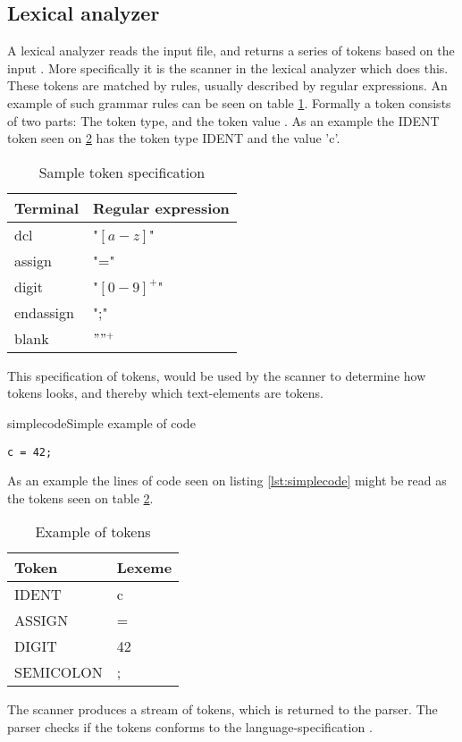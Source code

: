 \subsection{Lexical analyzer}
A lexical analyzer reads the input file, and returns a series of tokens based on the input \citep{CraftingACompiler}. More specifically it is the scanner in the lexical analyzer which does this. These tokens are matched by rules, usually described by regular expressions. An example of such grammar rules can be seen on table \ref{tab:tokenspecification}. Formally a token consists of two parts: The token type, and the token value \citep{CraftingACompiler}. As an example the IDENT token seen on \ref{tab:tokensexample} has the token type IDENT and the value 'c'. 

\begin{table}[H]
\begin{tabular}{|l|l|}
\hline
    	Terminal  	& Regular expression 	\\ \hline
    	dcl       	& "$[a-z]$"      			\\ 
    	assign    	& "="      				\\ 
    	digit     	& "$[0-9]^+$"   			\\ 
    	endassign 	& ";"      				\\
    	blank 		& $" "^+$					\\
    \hline
\end{tabular}
\caption{Sample token specification}
\label{tab:tokenspecification}
\end{table}
This specification of tokens, would be used by the scanner to determine how tokens looks, and thereby which text-elements are tokens. 

\begin{code}{simplecode}{Simple example of code}
\begin{lstlisting}
c = 42;
\end{lstlisting}
\end{code}

As an example the lines of code seen on listing \ref{lst:simplecode} might be read as the tokens seen on table \ref{tab:tokensexample}.
\begin{table}[H]
\begin{tabular}{|l|l|}
\hline
    \textbf{Token}     &\textbf{Lexeme} \\ \hline
    IDENT     & c      \\ 
    ASSIGN    & =      \\ 
    DIGIT     & 42     \\ 
    SEMICOLON & ;      \\
    \hline
\end{tabular}
\caption{Example of tokens}
\label{tab:tokensexample}
\end{table}
The scanner produces a stream of tokens, which is returned to the parser. The parser checks if the tokens conforms to the language-specification \citep{CraftingACompiler}.